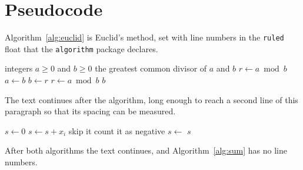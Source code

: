 \documentclass[11pt,a4paper]{article}
\begin{document}
\section{Pseudocode}
Algorithm~\ref{alg:euclid} is Euclid's method, set with line numbers in the
\texttt{ruled} float that the \texttt{algorithm} package declares.

\begin{algorithm}[H]
\caption{Euclid's algorithm}\label{alg:euclid}
\begin{algorithmic}[1]
\Require integers $a \ge 0$ and $b \ge 0$
\Ensure the greatest common divisor of $a$ and $b$
  \State $r \gets a \bmod b$
    \State $a \gets b$
    \State $b \gets r$
    \State $r \gets a \bmod b$
  \EndWhile
  \State \Return $b$
\EndProcedure
\end{algorithmic}
\end{algorithm}

The text continues after the algorithm, long enough to reach a second line
of this paragraph so that its spacing can be measured.

\begin{algorithm}[H]
\caption{Sum of the positive entries}\label{alg:sum}
\begin{algorithmic}
  \State $s \gets 0$
      \State $s \gets s + x_i$
      \State skip it
    \Else
      \State count it as negative
    \EndIf
  \EndFor
  \Repeat
    \State $s \gets$ 
  \State \Return $s$
\EndFunction
\end{algorithmic}
\end{algorithm}

After both algorithms the text continues, and Algorithm~\ref{alg:sum} has
no line numbers.
\end{document}
